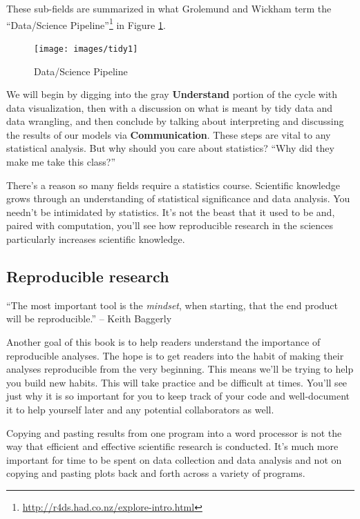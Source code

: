 \documentclass[12pt, krantz2,]{krantz}
\renewenvironment{quote}{\begin{VF}}{\end{VF}}
\renewcommand{\href}[2]{#2\footnote{\url{#1}}}
\begin{document}
These sub-fields are summarized in what Grolemund and Wickham term the \href{http://r4ds.had.co.nz/explore-intro.html}{``Data/Science Pipeline''} in Figure \ref{fig:pipeline-figure}.

\begin{figure}

{\centering \texttt{[image: images/tidy1]} 

}

\caption{Data/Science Pipeline}\label{fig:pipeline-figure}
\end{figure}

We will begin by digging into the gray \textbf{Understand} portion of the cycle with data visualization, then with a discussion on what is meant by tidy data and data wrangling, and then conclude by talking about interpreting and discussing the results of our models via \textbf{Communication}. These steps are vital to any statistical analysis. But why should you care about statistics? ``Why did they make me take this class?''

There's a reason so many fields require a statistics course. Scientific knowledge grows through an understanding of statistical significance and data analysis. You needn't be intimidated by statistics. It's not the beast that it used to be and, paired with computation, you'll see how reproducible research in the sciences particularly increases scientific knowledge.

\hypertarget{subsec:reproducible}{%
\subsection{Reproducible research}\label{subsec:reproducible}}

\begin{quote}
``The most important tool is the \emph{mindset}, when starting, that the end product will be reproducible.'' -- Keith Baggerly
\end{quote}

Another goal of this book is to help readers understand the importance of reproducible analyses. The hope is to get readers into the habit of making their analyses reproducible from the very beginning. This means we'll be trying to help you build new habits. This will take practice and be difficult at times. You'll see just why it is so important for you to keep track of your code and well-document it to help yourself later and any potential collaborators as well.

Copying and pasting results from one program into a word processor is not the way that efficient and effective scientific research is conducted. It's much more important for time to be spent on data collection and data analysis and not on copying and pasting plots back and forth across a variety of programs.
\end{document}
